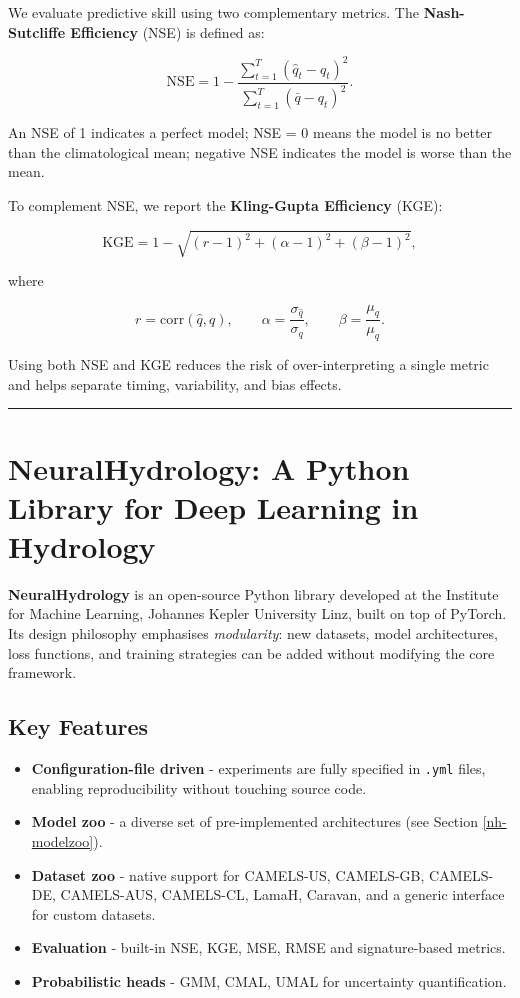 \documentclass[
]{krantz}
\providecommand{\tightlist}{%
  \setlength{\itemsep}{0pt}\setlength{\parskip}{0pt}}
\begin{document}
We evaluate predictive skill using two complementary metrics. The
\textbf{Nash-Sutcliffe Efficiency} (NSE) is defined as:

\[
  \text{NSE} = 1 - \frac{\sum_{t=1}^{T}(\hat{q}_t - q_t)^2}{\sum_{t=1}^{T}(\bar{q} - q_t)^2}.
\]

An NSE of 1 indicates a perfect model; NSE = 0 means the model is no better than the
climatological mean; negative NSE indicates the model is worse than the mean.

To complement NSE, we report the \textbf{Kling-Gupta Efficiency} (KGE):

\[
  \text{KGE} = 1 - \sqrt{(r-1)^2 + (\alpha-1)^2 + (\beta-1)^2},
\]

where

\[
r = \mathrm{corr}(\hat{q}, q), \qquad
\alpha = \frac{\sigma_{\hat{q}}}{\sigma_q}, \qquad
\beta = \frac{\mu_{\hat{q}}}{\mu_q}.
\]

Using both NSE and KGE reduces the risk of over-interpreting a single metric and helps
separate timing, variability, and bias effects.

\begin{center}\rule{0.5\linewidth}{0.5pt}\end{center}

\section{NeuralHydrology: A Python Library for Deep Learning in Hydrology}\label{nh-lib}

\textbf{NeuralHydrology} \citep{kratzert2022joss} is an open-source Python library developed at
the Institute for Machine Learning, Johannes Kepler University Linz, built on top of
PyTorch. Its design philosophy emphasises \emph{modularity}: new datasets, model
architectures, loss functions, and training strategies can be added without modifying
the core framework.

\subsection{Key Features}\label{key-features}

\begin{itemize}
\tightlist
\item
  \textbf{Configuration-file driven} - experiments are fully specified in \texttt{.yml} files,
  enabling reproducibility without touching source code.
\item
  \textbf{Model zoo} - a diverse set of pre-implemented architectures (see Section \ref{nh-modelzoo}).
\item
  \textbf{Dataset zoo} - native support for CAMELS-US, CAMELS-GB, CAMELS-DE, CAMELS-AUS,
  CAMELS-CL, LamaH, Caravan, and a generic interface for custom datasets.
\item
  \textbf{Evaluation} - built-in NSE, KGE, MSE, RMSE and signature-based metrics.
\item
  \textbf{Probabilistic heads} - GMM, CMAL, UMAL for uncertainty quantification.
\end{itemize}
\end{document}

